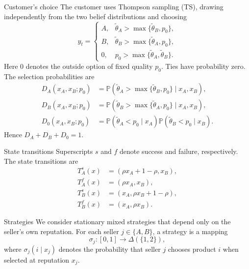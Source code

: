 \documentclass[10pt]{beamer}
\begin{document}
\begin{frame}{Customer's choice}
    The customer uses Thompson sampling (TS), drawing independently from the
    two belief distributions and choosing
    \begin{equation}
        y_t=
        \begin{cases}
            A,&\widetilde\theta_A>\max\{\widetilde\theta_B,p_0\},\\
            B,&\widetilde\theta_B>\max\{\widetilde\theta_A,p_0\},\\
            0,&p_0>\max\{\widetilde\theta_A,\widetilde\theta_B\}.
        \end{cases}
    \end{equation}
    Here $0$ denotes the outside option of fixed quality $p_0$.
    Ties have probability zero. The selection probabilities are
    \begin{equation}
        \begin{aligned}
            D_A(x_A,x_B;p_0)&=\mathbb{P}(\widetilde\theta_A>\max\{\widetilde\theta_B,p_0\}\mid x_A,x_B),\\
            D_B(x_A,x_B;p_0)&=\mathbb{P}(\widetilde\theta_B>\max\{\widetilde\theta_A,p_0\}\mid x_A,x_B),\\
            D_0(x_A,x_B;p_0)&=\mathbb{P}(\widetilde\theta_A<p_0\mid x_A)
                \mathbb{P}(\widetilde\theta_B<p_0\mid x_B).
        \end{aligned}
    \end{equation}
    Hence $D_A+D_B+D_0=1$.
\end{frame}

\begin{frame}{State transitions}
    Superscripts $s$ and $f$ denote success and failure,
    respectively. The state transitions are
    \begin{equation}
        \begin{aligned}
            T_A^s(x)&=(\rho x_A+1-\rho,x_B),\\
            T_A^f(x)&=(\rho x_A,x_B),\\
            T_B^s(x)&=(x_A,\rho x_B+1-\rho),\\
            T_B^f(x)&=(x_A,\rho x_B).
        \end{aligned}
    \end{equation}
\end{frame}

\begin{frame}{Strategies}
    We consider stationary mixed strategies that depend only
    on the seller's own reputation. For each seller $j\in\{A,B\}$,
    a strategy is a mapping
    \begin{equation}
        \sigma_j:[0,1]\rightarrow\Delta(\{1,2\}),
    \end{equation}
    where $\sigma_j(i\mid x_j)$ denotes the probability that
    seller $j$ chooses product $i$ when selected at reputation
    $x_j$.
\end{frame}
\end{document}
